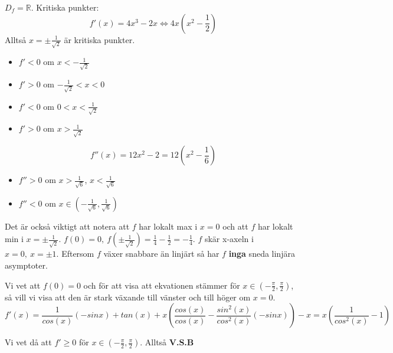 \documentclass{report}
\begin{document}
\vspace{50pt}
{

$ D_f = \mathbb{R} $. Kritiska punkter:
\begin{equation*}
f'(x) = 4x^3-2x \iff 4x(x^2- \frac{1}{2} ) 
\end{equation*}
Alltså $ x = \pm \frac{1}{ \sqrt{2} }  $ är kritiska punkter.
\begin{itemize}
	\item $ f' < 0 $ om $ x < - \frac{1}{ \sqrt{2} }  $
	\item $ f' > 0 $ om $ - \frac{1}{ \sqrt{2} } < x < 0 $
	\item $ f' < 0 $ om $ 0 < x < \frac{1}{ \sqrt{2} }  $
	\item $ f' > 0 $ om $ x > \frac{1}{ \sqrt{2} }  $ 
\end{itemize}
\begin{equation*}
f''(x) = 12x^2-2 = 12(x^2- \frac{1}{6} )
\end{equation*}
\begin{itemize}
	\item $ f'' > 0 $ om $ x > \frac{1}{ \sqrt{6} }  $, $ x < \frac{1}{ \sqrt{6} }  $
	\item $ f'' < 0 $ om $ x \in ( - \frac{1}{ \sqrt{6} } , \frac{1}{ \sqrt{6} } ) $  
\end{itemize}
Det är också viktigt att notera att $ f $ har lokalt max i $ x = 0 $ och att $ f $ har lokalt min i $ x = \pm \frac{1}{ \sqrt{2} }  $. $ f(0) = 0,\: f( \pm \frac{1}{ \sqrt{2} } ) = \frac{1}{4} - \frac{1}{2} = - \frac{1}{4}  $. $ f $ skär x-axeln i $ x = 0,\:x = \pm 1 $. Eftersom $ f $ växer snabbare än linjärt så har $ f $ \textbf{inga} sneda linjära asymptoter. 
}

\pagebreak
{}
{
Vi vet att $ f(0) = 0 $ och för att visa att ekvationen stämmer för $ x \in ( - \frac{\pi}{2} , \frac{\pi}{2} ) $, så vill vi visa att den är stark växande till vänster och till höger om $ x = 0 $.
\begin{equation*}
f'(x) = \frac{1}{cos(x)} (-sinx) + tan(x) + x( \frac{cos(x)}{cos(x)} - \frac{sin^2(x)}{cos^2(x)} (-sinx) ) -x = x( \frac{1}{cos^2(x)} - 1)
\end{equation*}

Vi vet då att $ f' \ge 0 $ för $ x \in ( - \frac{\pi}{2}, \frac{\pi}{2}  ) $. Alltså \textbf{V.S.B}  
}
\end{document}
